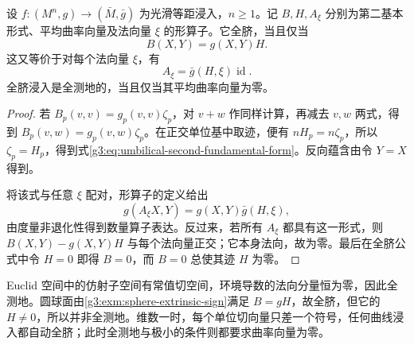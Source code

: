 \begin{proposition}\label{g3:prop:umbilical-characterization}
	设 \(f:(M^n,g)\to(\bar M,\bar g)\) 为光滑等距浸入，\(n\ge1\)。记 \(B,H,A_\xi\) 分别为第二基本形式、平均曲率向量及法向量 \(\xi\) 的形算子。它全脐，当且仅当
	\begin{equation}\label{g3:eq:umbilical-second-fundamental-form}
		B(X,Y)=g(X,Y)H.
	\end{equation}
	这又等价于对每个法向量 \(\xi\)，有
	\[
		A_\xi=\bar g(H,\xi)\operatorname{id}.
	\]
	全脐浸入是全测地的，当且仅当其平均曲率向量为零。
\end{proposition}
\begin{proof}
	若 \(B_p(v,v)=g_p(v,v)\zeta_p\)，对 \(v+w\) 作同样计算，再减去 \(v,w\) 两式，得到
	\(B_p(v,w)=g_p(v,w)\zeta_p\)。在正交单位基中取迹，便有
	\(nH_p=n\zeta_p\)，所以 \(\zeta_p=H_p\)，得到式\eqref{g3:eq:umbilical-second-fundamental-form}。反向蕴含由令 \(Y=X\) 得到。

	将该式与任意 \(\xi\) 配对，形算子的定义给出
	\[
		g(A_\xi X,Y)=g(X,Y)\bar g(H,\xi),
	\]
	由度量非退化性得到数量算子表达。反过来，若所有 \(A_\xi\) 都具有这一形式，则 \(B(X,Y)-g(X,Y)H\) 与每个法向量正交；它本身法向，故为零。最后在全脐公式中令 \(H=0\) 即得 \(B=0\)，而 \(B=0\) 总使其迹 \(H\) 为零。
\end{proof}

Euclid 空间中的仿射子空间有常值切空间，环境导数的法向分量恒为零，因此全测地。圆球面由\cref{g3:exm:sphere-extrinsic-sign}满足 \(B=gH\)，故全脐，但它的 \(H\ne0\)，所以并非全测地。维数一时，每个单位切向量只差一个符号，任何曲线浸入都自动全脐；此时全测地与极小的条件则都要求曲率向量为零。

